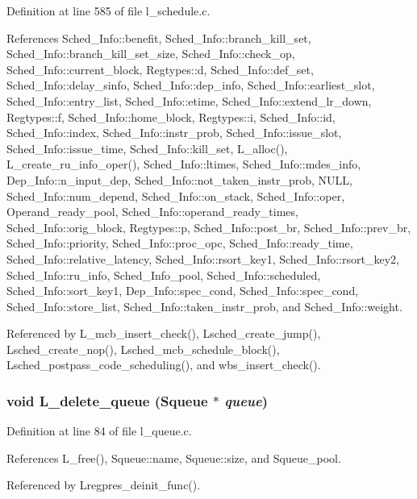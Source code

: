 Definition at line 585 of file l\_\-schedule.c.

References Sched\_\-Info::benefit, Sched\_\-Info::branch\_\-kill\_\-set, Sched\_\-Info::branch\_\-kill\_\-set\_\-size, Sched\_\-Info::check\_\-op, Sched\_\-Info::current\_\-block, Regtypes::d, Sched\_\-Info::def\_\-set, Sched\_\-Info::delay\_\-sinfo, Sched\_\-Info::dep\_\-info, Sched\_\-Info::earliest\_\-slot, Sched\_\-Info::entry\_\-list, Sched\_\-Info::etime, Sched\_\-Info::extend\_\-lr\_\-down, Regtypes::f, Sched\_\-Info::home\_\-block, Regtypes::i, Sched\_\-Info::id, Sched\_\-Info::index, Sched\_\-Info::instr\_\-prob, Sched\_\-Info::issue\_\-slot, Sched\_\-Info::issue\_\-time, Sched\_\-Info::kill\_\-set, L\_\-alloc(), L\_\-create\_\-ru\_\-info\_\-oper(), Sched\_\-Info::ltimes, Sched\_\-Info::mdes\_\-info, Dep\_\-Info::n\_\-input\_\-dep, Sched\_\-Info::not\_\-taken\_\-instr\_\-prob, NULL, Sched\_\-Info::num\_\-depend, Sched\_\-Info::on\_\-stack, Sched\_\-Info::oper, Operand\_\-ready\_\-pool, Sched\_\-Info::operand\_\-ready\_\-times, Sched\_\-Info::orig\_\-block, Regtypes::p, Sched\_\-Info::post\_\-br, Sched\_\-Info::prev\_\-br, Sched\_\-Info::priority, Sched\_\-Info::proc\_\-opc, Sched\_\-Info::ready\_\-time, Sched\_\-Info::relative\_\-latency, Sched\_\-Info::rsort\_\-key1, Sched\_\-Info::rsort\_\-key2, Sched\_\-Info::ru\_\-info, Sched\_\-Info\_\-pool, Sched\_\-Info::scheduled, Sched\_\-Info::sort\_\-key1, Dep\_\-Info::spec\_\-cond, Sched\_\-Info::spec\_\-cond, Sched\_\-Info::store\_\-list, Sched\_\-Info::taken\_\-instr\_\-prob, and Sched\_\-Info::weight.

Referenced by L\_\-mcb\_\-insert\_\-check(), Lsched\_\-create\_\-jump(), Lsched\_\-create\_\-nop(), Lsched\_\-mcb\_\-schedule\_\-block(), Lsched\_\-postpass\_\-code\_\-scheduling(), and wbs\_\-insert\_\-check().
\subsubsection{\setlength{\rightskip}{0pt plus 5cm}void L\_\-delete\_\-queue (\bf{Squeue} $\ast$ {\em queue})}\label{l__schedule_8h_bbbeef78440f0b1f5dcef84469fda654}




Definition at line 84 of file l\_\-queue.c.

References L\_\-free(), Squeue::name, Squeue::size, and Squeue\_\-pool.

Referenced by Lregpres\_\-deinit\_\-func().
